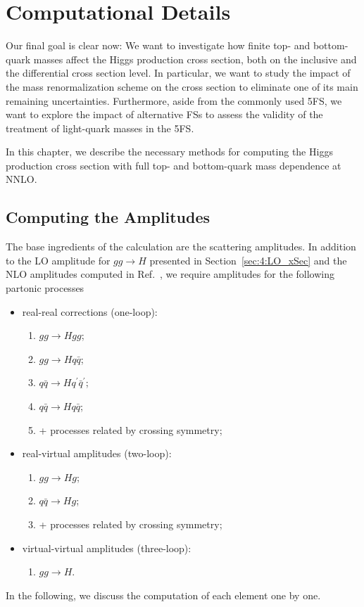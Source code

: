 
\chapter{Computational Details}\label{chap:5:computational_details}

Our final goal is clear now: We want to investigate how finite top- and bottom-quark masses affect the Higgs production cross section, both on the inclusive and the differential cross section level. In particular, we want to study the impact of the mass renormalization scheme on the cross section to eliminate one of its main remaining uncertainties. Furthermore, aside from the commonly used 5\acs{FS}, we want to explore the impact of alternative \acs{FS}s to assess the validity of the treatment of light-quark masses in the 5\acs{FS}.

In this chapter, we describe the necessary methods for computing the Higgs production cross section with full top- and bottom-quark mass dependence at \acs{NNLO}.

\section{Computing the Amplitudes}
The base ingredients of the calculation are the scattering amplitudes. In addition to the \acs{LO} amplitude for $gg \rightarrow H$ presented in Section~\ref{sec:4:LO_xSec} and the \acs{NLO} amplitudes computed in Ref.~\cite{Graudenz:1992pv}, we require amplitudes for the following partonic processes
\begin{itemize}
  \item real-real corrections (one-loop):
  \begin{enumerate}
    \item $gg \rightarrow H gg$;
    \item $gg \rightarrow H q \bar{q}$;
    \item $q\bar{q} \rightarrow H q^\prime \bar{q}^\prime$;
    \item $q\bar{q} \rightarrow H q \bar{q}$;
    \item + processes related by crossing symmetry;
  \end{enumerate}
  \item real-virtual amplitudes (two-loop):
  \begin{enumerate}
    \item $gg \rightarrow Hg$;
    \item $q \bar{q} \rightarrow H g$;
    \item + processes related by crossing symmetry;
  \end{enumerate}
  \item virtual-virtual amplitudes (three-loop):
  \begin{enumerate}
    \item $g g \rightarrow H$.
  \end{enumerate}
\end{itemize}
In the following, we discuss the computation of each element one by one.


